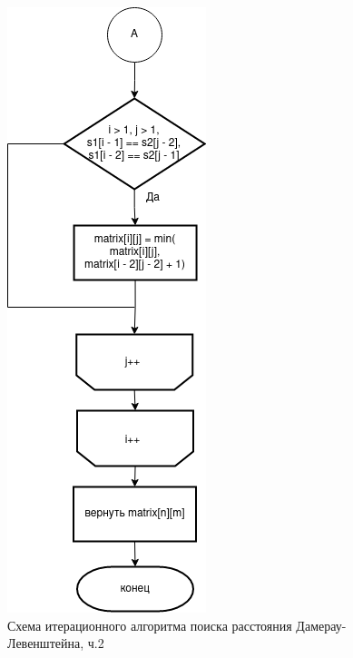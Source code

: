 \documentclass[12pt]{report}
\begin{document}
	\begin{figure}[H]
		\centering
		\includegraphics{DamLev_2}
		\caption{Схема итерационного алгоритма поиска расстояния Дамерау-Левенштейна, ч.2}
		\label{fig:schema_bucket_3}
	\end{figure}
	
\end{document}
